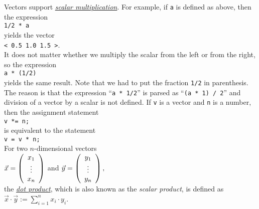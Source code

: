Vectors support 
\href{http://en.wikipedia.org/wiki/Scalar_multiplication}{\emph{scalar multiplication}}.  For
example, if \texttt{a} is defined as above, then the expression
\\[0.2cm]
\hspace*{1.3cm}
\texttt{1/2 * a}
\\[0.2cm]
yields the vector
\\[0.2cm]
\hspace*{1.3cm}
\texttt{< 0.5  1.0  1.5 >}.
\\[0.2cm]
It does not matter whether we multiply the scalar from the left or from the right, so the expression
\\[0.2cm]
\hspace*{1.3cm}
\texttt{a * (1/2)}
\\[0.2cm]
yields the same result.  Note that we had to put the fraction \texttt{1/2} in parenthesis.  The
reason is that the expression ``\texttt{a * 1/2}'' is parsed as ``\texttt{(a * 1) / 2}'' and
division of a vector by a scalar is not defined.  If \texttt{v} is a vector and \texttt{n} is a
number, then the assignment statement
\\[0.2cm]
\hspace*{1.3cm}
\texttt{v *= n;}
\\[0.2cm]
is equivalent to the statement
\\[0.2cm]
\hspace*{1.3cm}
\texttt{v = v * n;}
\\[0.2cm]
For two $n$-dimensional vectors
\\[0.2cm]
\hspace*{1.3cm}
$\vec{x} = \left(
  \begin{array}[c]{c}
  x_1 \\
  \vdots \\
  x_n    
  \end{array}
\right)
$ 
\quad and \quad
$\vec{y} = \left(
  \begin{array}[c]{c}
  y_1 \\
  \vdots \\
  y_n    
  \end{array}
\right),
$ 
\\[0.2cm]
the \href{http://en.wikipedia.org/wiki/Dot_product}{\emph{dot product}}, which is also known as the  
\emph{scalar product}, is defined as
\\[0.2cm]
\hspace*{1.3cm}
$\vec{x} \cdot \vec{y} := \sum\limits_{i=1}^n x_i \cdot y_i$.
\\[0.2cm]
